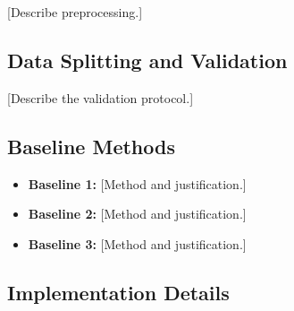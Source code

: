 \documentclass[conference]{IEEEtran}
\begin{document}
%
%
%

[Describe preprocessing.]


\subsection{Data Splitting and Validation}

%
%
%
%
%

[Describe the validation protocol.]


\subsection{Baseline Methods}

%
%
%

\begin{itemize}

    \item \textbf{Baseline 1:} [Method and justification.]

    \item \textbf{Baseline 2:} [Method and justification.]

    \item \textbf{Baseline 3:} [Method and justification.]

\end{itemize}


\subsection{Implementation Details}

%
%
\end{document}
